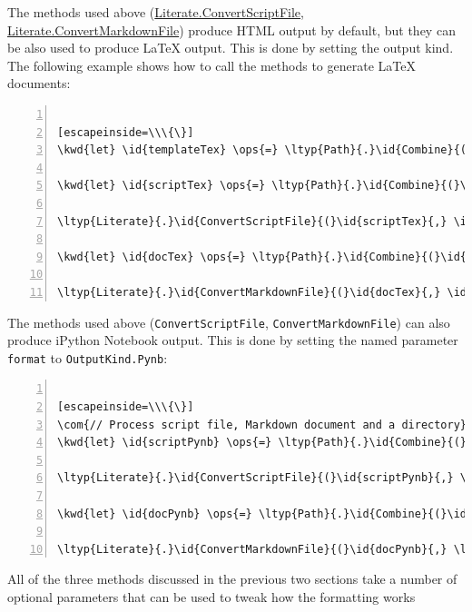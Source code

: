 \documentclass{article}
\newcommand{\id}[1]{\textcolor{black}{#1}}
\newcommand{\com}[1]{\textcolor{officegreen}{#1}}
\newcommand{\kwd}[1]{\textcolor{navy}{#1}}
\newcommand{\ops}[1]{\textcolor{purple}{#1}}
\newcommand{\str}[1]{\textcolor{olive}{#1}}
\begin{document}
The methods used above (\href{https://fsprojects.github.io/FSharp.Formatting/reference/fsharp-formatting-literate-literate.html}{Literate.ConvertScriptFile}, \href{https://fsprojects.github.io/FSharp.Formatting/reference/fsharp-formatting-literate-literate.html}{Literate.ConvertMarkdownFile})
produce HTML output by default, but they can be also used to produce LaTeX output. This is done
by setting the output kind. The following
example shows how to call the methods to generate LaTeX documents:
\begin{lstlisting}[numbers=left]

[escapeinside=\\\{\}]
\kwd{let} \id{templateTex} \ops{=} \ltyp{Path}{.}\id{Combine}{(}\id{source}{,} \str{"template.tex"}{)}

\kwd{let} \id{scriptTex} \ops{=} \ltyp{Path}{.}\id{Combine}{(}\id{source}{,} \str{"../docs/script.fsx"}{)}

\ltyp{Literate}{.}\id{ConvertScriptFile}{(}\id{scriptTex}{,} \id{templateTex}{,} \lfun{outputKind} \ops{=} \ltyp{OutputKind}{.}\id{Latex}{)}

\kwd{let} \id{docTex} \ops{=} \ltyp{Path}{.}\id{Combine}{(}\id{source}{,} \str{"../docs/document.md"}{)}

\ltyp{Literate}{.}\id{ConvertMarkdownFile}{(}\id{docTex}{,} \id{templateTex}{,} \lfun{outputKind} \ops{=} \ltyp{OutputKind}{.}\id{Latex}{)}

\end{lstlisting}



The methods used above (\texttt{ConvertScriptFile}, \texttt{ConvertMarkdownFile})
can also produce iPython Notebook output. This is done
by setting the named parameter \texttt{format} to \texttt{OutputKind.Pynb}:
\begin{lstlisting}[numbers=left]

[escapeinside=\\\{\}]
\com{// Process script file, Markdown document and a directory}
\kwd{let} \id{scriptPynb} \ops{=} \ltyp{Path}{.}\id{Combine}{(}\id{source}{,} \str{"../docs/script.fsx"}{)}

\ltyp{Literate}{.}\id{ConvertScriptFile}{(}\id{scriptPynb}{,} \lfun{outputKind} \ops{=} \ltyp{OutputKind}{.}\id{Pynb}{)}

\kwd{let} \id{docPynb} \ops{=} \ltyp{Path}{.}\id{Combine}{(}\id{source}{,} \str{"../docs/document.md"}{)}

\ltyp{Literate}{.}\id{ConvertMarkdownFile}{(}\id{docPynb}{,} \lfun{outputKind} \ops{=} \ltyp{OutputKind}{.}\id{Pynb}{)}

\end{lstlisting}



All of the three methods discussed in the previous two sections take a number of optional
parameters that can be used to tweak how the formatting works
\end{document}
